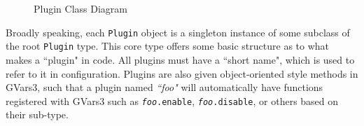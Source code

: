 \documentclass[a4paper,10pt]{article}
\begin{document}
\begin{figure}[h]
\begin{center}
        \normalsize
  \end{center}
  \caption{Plugin Class Diagram}
  \label{pluginclasses}
\end{figure}

Broadly speaking, each \texttt{Plugin} object is a singleton instance of some subclass of the root \texttt{Plugin} type. This core type offers some basic structure as to what makes a ``plugin" in code. All plugins must have a ``short name", which is used to refer to it in configuration. Plugins are also given object-oriented style methods in GVars3, such that a plugin named \textit{``foo"} will automatically have functions registered with GVars3 such as  \texttt{\textit{foo}.enable},  \texttt{\textit{foo}.disable}, or others based on their sub-type. 
\end{document}
